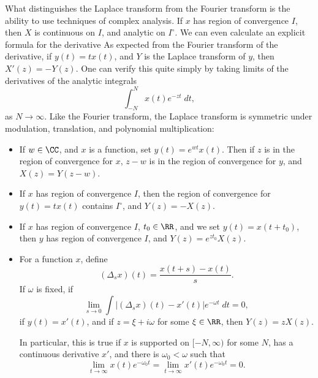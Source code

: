 What distinguishes the Laplace transform from the Fourier transform is the ability to use techniques of complex analysis. If $x$ has region of convergence $I$, then $X$ is continuous on $I$, and analytic on $I^\circ$. We can even calculate an explicit formula for the derivative As expected from the Fourier transform of the derivative, if $y(t) = tx(t)$, and $Y$ is the Laplace transform of $y$, then $X'(z) = -Y(z)$. One can verify this quite simply by taking limits of the derivatives of the analytic integrals
%
\[ \int_{-N}^N x(t) e^{-zt}\; dt, \]
%
as $N \to \infty$. Like the Fourier transform, the Laplace transform is symmetric under modulation, translation, and polynomial multiplication:
%
\begin{itemize}
    \item If $w \in \CC$, and $x$ is a function, set $y(t) = e^{wt} x(t)$. Then if $z$ is in the region of convergence for $x$, $z - w$ is in the region of convergence for $y$, and $X(z) = Y(z-w)$.

    \item If $x$ has region of convergence $I$, then the region of convergence for $y(t) = tx(t)$ contains $I^\circ$, and $Y(z) = -X(z)$.

    \item If $x$ has region of convergence $I$, $t_0 \in \RR$, and we set $y(t) = x(t + t_0)$, then $y$ has region of convergence $I$, and $Y(z) = e^{zt_0} X(z)$.

    \item For a function $x$, define
    \[ (\Delta_s x)(t) = \frac{x(t + s) - x(t)}{s}. \]
    If $\omega$ is fixed, if
    \[ \lim_{s \to 0} \int |(\Delta_s x)(t) - x'(t)| e^{-\omega t}\; dt = 0, \]
    if $y(t) = x'(t)$, and if $z = \xi + i \omega$ for some $\xi \in \RR$, then $Y(z) = z X(z)$.

    In particular, this is true if $x$ is supported on $[-N,\infty)$ for some $N$, has a continuous derivative $x'$, and there is $\omega_0 < \omega$ such that
    \[ \lim_{t \to \infty} x(t) e^{-\omega_0 t} = \lim_{t \to \infty} x'(t) e^{-\omega_0 t} = 0. \]
\end{itemize}

